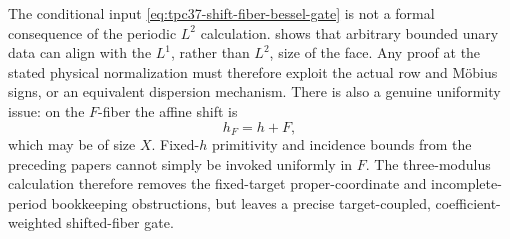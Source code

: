 The conditional input
\eqref{eq:tpc37-shift-fiber-bessel-gate} is not a formal consequence of
the periodic \(L^2\) calculation.
 shows that arbitrary bounded unary
data can align with the \(L^1\), rather than \(L^2\), size of the face.
Any proof at the stated physical normalization must therefore exploit
the actual row and M\"obius signs, or an equivalent dispersion
mechanism.  There is also a genuine uniformity issue: on the \(F\)-fiber
the affine shift is
\begin{equation}
 h_F=h+F,
 \label{eq:tpc37-moving-shift}
\end{equation}
which may be of size \(X\).  Fixed-\(h\) primitivity and incidence bounds
from the preceding papers cannot simply be invoked uniformly in \(F\).
The three-modulus calculation therefore removes the fixed-target
proper-coordinate and incomplete-period bookkeeping obstructions, but
leaves a precise target-coupled, coefficient-weighted shifted-fiber gate.
